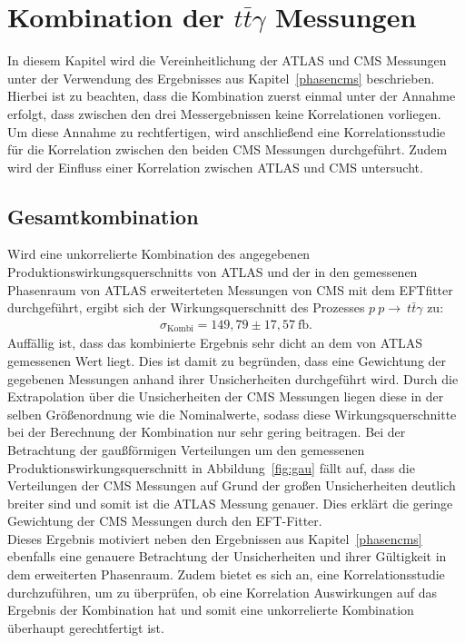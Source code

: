 \chapter{Kombination der \texorpdfstring {$t\bar{t}\gamma$}{math} Messungen}
In diesem Kapitel wird die Vereinheitlichung der ATLAS und CMS Messungen unter der Verwendung des Ergebnisses aus Kapitel~\ref{phasencms} beschrieben. Hierbei ist zu beachten, dass die Kombination zuerst einmal unter der Annahme erfolgt, dass zwischen den drei Messergebnissen keine Korrelationen vorliegen. Um diese Annahme zu rechtfertigen, wird anschließend eine Korrelationsstudie für die Korrelation zwischen den beiden CMS Messungen durchgeführt. Zudem wird der Einfluss einer Korrelation zwischen ATLAS und CMS untersucht.

\section{Gesamtkombination}
\label{kombi}
Wird eine unkorrelierte Kombination des angegebenen Produktionswirkungsquerschnitts von ATLAS und der in den gemessenen Phasenraum von ATLAS erweiterteten Messungen von CMS mit dem EFTfitter durchgeführt, ergibt sich der Wirkungsquerschnitt des Prozesses $p~p \rightarrow~t\bar{t}\gamma$ zu:
\begin{align}
  \sigma_{\text{Kombi}} = 149,79 \pm 17,57~ \si{\femto\barn}.
\end{align}
Auffällig ist, dass das kombinierte Ergebnis sehr dicht an dem von ATLAS gemessenen Wert liegt.
Dies ist damit zu begründen, dass eine Gewichtung der gegebenen Messungen anhand ihrer Unsicherheiten durchgeführt wird.
Durch die Extrapolation über die Unsicherheiten der CMS Messungen liegen diese in der selben Größenordnung wie die Nominalwerte, sodass diese Wirkungsquerschnitte bei der Berechnung der Kombination nur sehr gering beitragen. Bei der Betrachtung der gaußförmigen Verteilungen um den gemessenen Produktionswirkungsquerschnitt in Abbildung~\ref{fig:gau} fällt auf, dass die Verteilungen der CMS Messungen auf Grund der großen Unsicherheiten deutlich breiter sind und somit ist die ATLAS Messung genauer. Dies erklärt die geringe Gewichtung der CMS Messungen durch den EFT-Fitter.\\
Dieses Ergebnis motiviert neben den Ergebnissen aus Kapitel~\ref{phasencms} ebenfalls eine genauere Betrachtung der Unsicherheiten und ihrer Gültigkeit in dem erweiterten Phasenraum. Zudem bietet es sich an, eine Korrelationsstudie durchzuführen, um zu überprüfen, ob eine Korrelation Auswirkungen auf das Ergebnis der Kombination hat und somit eine unkorrelierte Kombination überhaupt gerechtfertigt ist.

